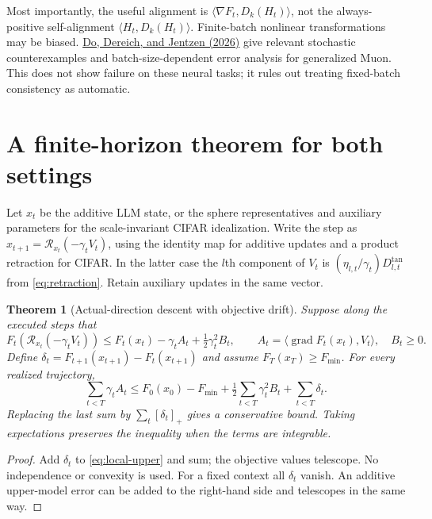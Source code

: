 \documentclass[11pt]{article}
\newtheorem{theorem}{Theorem}[section]
\newcommand{\ip}[2]{\langle #1,#2\rangle}
\begin{document}
Most importantly, the useful alignment is
$\ip{\nabla F_t}{D_k(H_t)}$, not the always-positive self-alignment
$\ip{H_t}{D_k(H_t)}$. Finite-batch nonlinear transformations may be biased.
\href{https://arxiv.org/abs/2608.04607}{Do, Dereich, and Jentzen (2026)}
give relevant stochastic counterexamples and batch-size-dependent error
analysis for generalized Muon. This does not show failure on these neural
tasks; it rules out treating fixed-batch consistency as automatic.

\section{A finite-horizon theorem for both settings}

Let $x_t$ be the additive LLM state, or the sphere representatives and
auxiliary parameters for the scale-invariant CIFAR idealization. Write the
step as $x_{t+1}=\mathcal R_{x_t}(-\gamma_t V_t)$, using the identity map
for additive updates and a product retraction for CIFAR. In the latter case
the $l$th component of $V_t$ is
$(\eta_{l,t}/\gamma_t)D_{l,t}^{\mathrm{tan}}$ from
\eqref{eq:retraction}. Retain auxiliary updates in the same vector.

\begin{theorem}[Actual-direction descent with objective drift]
Suppose along the executed steps that
\begin{equation}\label{eq:local-upper}
 F_t(\mathcal R_{x_t}(-\gamma_t V_t))
 \leq F_t(x_t)-\gamma_t A_t+\tfrac12\gamma_t^2 B_t,
 \qquad A_t=\ip{\operatorname{grad}F_t(x_t)}{V_t},\quad B_t\geq0.
\end{equation}
Define $\delta_t=F_{t+1}(x_{t+1})-F_t(x_{t+1})$ and assume
$F_T(x_T)\geq F_{\min}$. For every realized trajectory,
\begin{equation}\label{eq:telescope}
 \sum_{t<T}\gamma_t A_t
 \leq F_0(x_0)-F_{\min}
 +\tfrac12\sum_{t<T}\gamma_t^2 B_t
 +\sum_{t<T}\delta_t.
\end{equation}
Replacing the last sum by $\sum_t[\delta_t]_+$ gives a conservative bound.
Taking expectations preserves the inequality when the terms are integrable.
\end{theorem}
\begin{proof}
Add $\delta_t$ to \eqref{eq:local-upper} and sum; the objective values
telescope. No independence or convexity is used. For a fixed context all
$\delta_t$ vanish. An additive upper-model error can be added to the
right-hand side and telescopes in the same way.
\end{proof}
\end{document}

